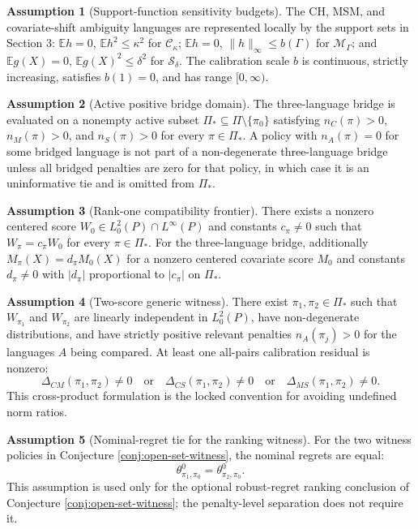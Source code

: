 \documentclass[11pt]{article}
\newcommand{\E}{\mathbb{E}}
\theoremstyle{definition}
\newtheorem{assumption}{Assumption}
\theoremstyle{plain}
\theoremstyle{remark}
\begin{document}
\begin{assumption}[Support-function sensitivity budgets]\label{ass:support-budgets}
The CH, MSM, and covariate-shift ambiguity languages are represented locally by the support sets in Section 3: $\E h=0$, $\E h^2\le\kappa^2$ for $\mathcal C_{\kappa}$; $\E h=0$, $\|h\|_{\infty}\le b(\Gamma)$ for $\mathcal M_{\Gamma}$; and $\E g(X)=0$, $\E g(X)^2\le\delta^2$ for $\mathcal S_{\delta}$.  The calibration scale $b$ is continuous, strictly increasing, satisfies $b(1)=0$, and has range $[0,\infty)$.
\end{assumption}

\begin{assumption}[Active positive bridge domain]\label{ass:active-domain}
The three-language bridge is evaluated on a nonempty active subset $\Pi_\ast\subseteq\Pi\setminus\{\pi_0\}$ satisfying $n_C(\pi)>0$, $n_M(\pi)>0$, and $n_S(\pi)>0$ for every $\pi\in\Pi_\ast$.  A policy with $n_A(\pi)=0$ for some bridged language is not part of a non-degenerate three-language bridge unless all bridged penalties are zero for that policy, in which case it is an uninformative tie and is omitted from $\Pi_\ast$.
\end{assumption}

\begin{assumption}[Rank-one compatibility frontier]\label{ass:rank-one}
There exists a nonzero centered score $W_0\in L^2_0(P)\cap L^{\infty}(P)$ and constants $c_{\pi}\ne0$ such that $W_{\pi}=c_{\pi}W_0$ for every $\pi\in\Pi_\ast$.  For the three-language bridge, additionally $M_{\pi}(X)=d_{\pi}M_0(X)$ for a nonzero centered covariate score $M_0$ and constants $d_{\pi}\ne0$ with $|d_{\pi}|$ proportional to $|c_{\pi}|$ on $\Pi_\ast$.
\end{assumption}

\begin{assumption}[Two-score generic witness]\label{ass:two-score}
There exist $\pi_1,\pi_2\in\Pi_\ast$ such that $W_{\pi_1}$ and $W_{\pi_2}$ are linearly independent in $L^2_0(P)$, have non-degenerate distributions, and have strictly positive relevant penalties $n_A(\pi_j)>0$ for the languages $A$ being compared.  At least one all-pairs calibration residual is nonzero:
\[
  \Delta_{CM}(\pi_1,\pi_2)\ne0
  \quad\text{or}\quad
  \Delta_{CS}(\pi_1,\pi_2)\ne0
  \quad\text{or}\quad
  \Delta_{MS}(\pi_1,\pi_2)\ne0.
\]
This cross-product formulation is the locked convention for avoiding undefined norm ratios.
\end{assumption}

\begin{assumption}[Nominal-regret tie for the ranking witness]\label{ass:nominal-tie}
For the two witness policies in Conjecture \ref{conj:open-set-witness}, the nominal regrets are equal:
\[
  \theta^0_{\pi_1,\pi_0}=\theta^0_{\pi_2,\pi_0}.
\]
This assumption is used only for the optional robust-regret ranking conclusion of Conjecture \ref{conj:open-set-witness}; the penalty-level separation does not require it.
\end{assumption}
\end{document}
